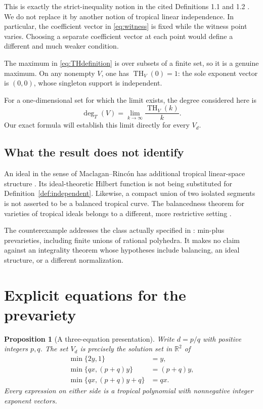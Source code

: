 \documentclass[11pt,a4paper]{article}
\numberwithin{equation}{section}
\newtheorem{proposition}[theorem]{Proposition}
\theoremstyle{definition}
\theoremstyle{remark}
\newcommand{\R}{\mathbb R}
\newcommand{\tHilb}{\operatorname{TH}}
\newcommand{\degT}{\operatorname{deg}_{T}}
\begin{document}
This is exactly the strict-inequality notion in the cited Definitions 1.1
and 1.2 \cite{Grigoriev2025}. We do not replace it by another notion of tropical
linear independence. In particular, the coefficient vector in
\eqref{eq:witness} is fixed while the witness point varies. Choosing a separate
coefficient vector at each point would define a different and much weaker
condition.

The maximum in \eqref{eq:THdefinition} is over subsets of a finite set, so it
is a genuine maximum. On any nonempty $V$, one has $\tHilb_V(0)=1$: the sole
exponent vector is $(0,0)$, whose singleton support is independent.

For a one-dimensional set for which the limit exists, the degree considered
here is
\begin{equation}
\label{eq:degree}
\degT(V)=\lim_{k\to\infty}\frac{\tHilb_V(k)}{k}.
\end{equation}
Our exact formula will establish this limit directly for every $V_d$.

\subsection{What the result does not identify}

An ideal in the sense of Maclagan--Rinc\'on has additional tropical linear-space
structure \cite{MaclaganRincon}. Its ideal-theoretic Hilbert function is not
being substituted for Definition~\ref{def:independent}. Likewise, a compact
union of two isolated segments is not asserted to be a balanced tropical
curve. The balancedness theorem for varieties of tropical ideals belongs to
a different, more restrictive setting \cite{Balanced}.

The counterexample addresses the class actually specified in
\cite{Grigoriev2025}: min-plus prevarieties, including finite unions of rational
polyhedra. It makes no claim against an integrality theorem whose hypotheses
include balancing, an ideal structure, or a different normalization.

\section{Explicit equations for the prevariety}
\label{sec:equations}

\begin{proposition}[A three-equation presentation]
\label{prop:equations}
Write $d=p/q$ with positive integers $p,q$. The set $V_d$ is precisely the
solution set in $\R^2$ of
\begin{align}
\min\{2y,1\}&=y,\label{eq:eq1}\\
\min\{qx,(p+q)y\}&=(p+q)y,\label{eq:eq2}\\
\min\{qx,(p+q)y+q\}&=qx.\label{eq:eq3}
\end{align}
Every expression on either side is a tropical polynomial with nonnegative
integer exponent vectors.
\end{proposition}
\end{document}
